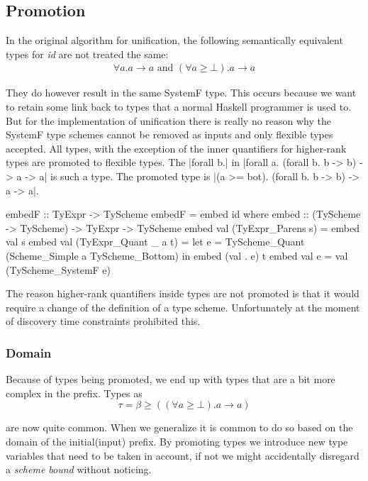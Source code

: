 \subsection{Promotion}
In the original algorithm for unification, the following semantically equivalent types for \emph{id} are not treated the same:
\begin{eqnarray*}
\forall a. a \rightarrow a \textrm{ and }
(\forall a \geq \bot). a \rightarrow a
\end{eqnarray*}

They do however result in the same SystemF type. This occurs because we want to retain some link back to types that a normal Haskell programmer is used to. But for the implementation of unification there is really no reason why the SystemF type schemes cannot be removed as inputs and only flexible types accepted. All types, with the exception of the inner quantifiers for higher-rank types are promoted to flexible types. The |forall b.| in |forall a. (forall b. b -> b) -> a -> a| is such a type. The promoted type is |(a >= bot). (forall b. b -> b) -> a -> a|.

\begin{code}
embedF :: TyExpr -> TyScheme
embedF = embed id
  where  embed :: (TyScheme -> TyScheme) -> TyExpr -> TyScheme
         embed val (TyExpr_Parens     s) = embed val s
         embed val (TyExpr_Quant  _ a t) = 
           let e = TyScheme_Quant (Scheme_Simple a TyScheme_Bottom)
           in  embed (val . e) t
         embed val e                     = val (TyScheme_SystemF e)
\end{code}

The reason higher-rank quantifiers inside types are not promoted is that it would require a change of the definition of a type scheme. Unfortunately at the moment of discovery time constraints prohibited this.
\subsubsection{Domain}
Because of types being promoted, we end up with types that are a bit more complex in the prefix. Types as 
\begin{equation}
\tau = \beta \geq ((\forall a \geq \bot). a \rightarrow a)
\end{equation}

are now quite common. When we generalize it is common to do so based on the domain of the initial(input) prefix. By promoting types we introduce new type variables that need to be taken in account, if not we might accidentally disregard a \emph{scheme bound} without noticing. 

